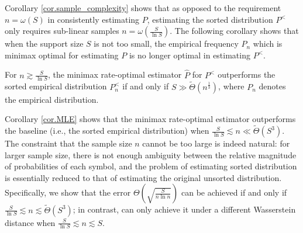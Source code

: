 \documentclass[final,12pt]{colt2018} %
\begin{document}
Corollary \ref{cor.sample_complexity} shows that as opposed to the requirement $n=\omega(S)$ in consistently estimating $P$, estimating the sorted distribution $P^<$ only requires sub-linear samples $n=\omega(\frac{S}{\ln S})$. The following corollary shows that when the support size $S$ is not too small, the empirical frequency $P_n$ which is minimax optimal for estimating $P$ is no longer optimal in estimating $P^<$.

\begin{corollary}\label{cor.MLE}
	For $n\gtrsim \frac{S}{\ln S}$, the minimax rate-optimal estimator $\hat{P}$ for $P^<$ outperforms the sorted empirical distribution $P_n^<$ if and only if $S\gg \tilde{\Theta}(n^{\frac{1}{3}})$, where $P_n$ denotes the empirical distribution.
\end{corollary}

Corollary \ref{cor.MLE} shows that the minimax rate-optimal estimator outperforms the baseline (i.e., the sorted empirical distribution) when $\frac{S}{\ln S} \lesssim n \ll \tilde{\Theta}(S^3)$. The constraint that the sample size $n$ cannot be too large is indeed natural: for larger sample size, there is not enough ambiguity between the relative magnitude of probabilities of each symbol, and the problem of estimating sorted distribution is essentially reduced to that of estimating the original unsorted distribution. Specifically, we show that the error $\Theta(\sqrt{\frac{S}{n\ln n}})$ can be achieved if and only if $\frac{S}{\ln S} \lesssim n \lesssim \tilde{\Theta}(S^3)$; in contrast, \cite{valiant2017estimating} can only achieve it under a different Wasserstein distance when $\frac{S}{\ln S}\lesssim n\lesssim S$. 
\end{document}

